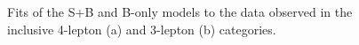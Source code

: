 \begin{figure}[h!]
\captionsetup[subfigure]{position=b}
\centering
{}
\caption{Fits of the S+B and B-only models to the data observed in the inclusive 4-lepton (a) and 3-lepton (b) categories.}
\label{fig:hmmPrecutFits}
\end{figure}

